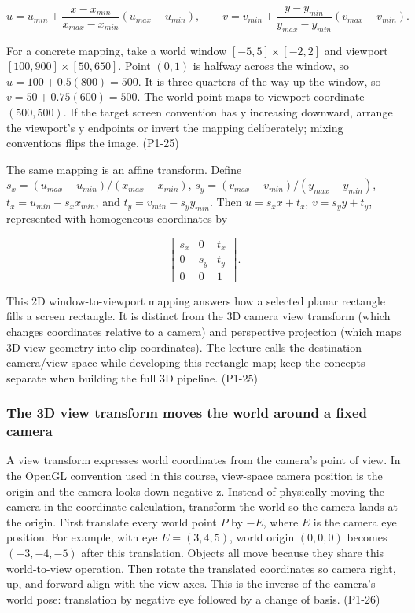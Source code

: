 \[
u=u_{min}+\frac{x-x_{min}}{x_{max}-x_{min}}(u_{max}-u_{min}),\qquad
v=v_{min}+\frac{y-y_{min}}{y_{max}-y_{min}}(v_{max}-v_{min}).
\]

For a concrete mapping, take a world window \([-5,5]\times[-2,2]\) and viewport \([100,900]\times[50,650]\). Point \((0,1)\) is halfway across the window, so \(u=100+0.5(800)=500\). It is three quarters of the way up the window, so \(v=50+0.75(600)=500\). The world point maps to viewport coordinate \((500,500)\). If the target screen convention has y increasing downward, arrange the viewport's y endpoints or invert the mapping deliberately; mixing conventions flips the image. (P1-25)

The same mapping is an affine transform. Define \(s_x=(u_{max}-u_{min})/(x_{max}-x_{min})\), \(s_y=(v_{max}-v_{min})/(y_{max}-y_{min})\), \(t_x=u_{min}-s_xx_{min}\), and \(t_y=v_{min}-s_yy_{min}\). Then \(u=s_xx+t_x\), \(v=s_yy+t_y\), represented with homogeneous coordinates by

\[
\begin{bmatrix}s_x&0&t_x\\0&s_y&t_y\\0&0&1\end{bmatrix}.
\]

This 2D window-to-viewport mapping answers how a selected planar rectangle fills a screen rectangle. It is distinct from the 3D camera view transform (which changes coordinates relative to a camera) and perspective projection (which maps 3D view geometry into clip coordinates). The lecture calls the destination camera/view space while developing this rectangle map; keep the concepts separate when building the full 3D pipeline. (P1-25)

\subsubsection{The 3D view transform moves the world around a fixed camera}\label{03-visual-computing-i-ch003-the-3d-view-transform-moves-the-world-around-a-fixed-camera}

\hypertarget{03-visual-computing-i-ch003-the-3d-view-transform-moves-the-world-around-a-fixed-camera}{}

A view transform expresses world coordinates from the camera's point of view. In the OpenGL convention used in this course, view-space camera position is the origin and the camera looks down negative z. Instead of physically moving the camera in the coordinate calculation, transform the world so the camera lands at the origin. First translate every world point \(P\) by \(-E\), where \(E\) is the camera eye position. For example, with eye \(E=(3,4,5)\), world origin \((0,0,0)\) becomes \((-3,-4,-5)\) after this translation. Objects all move because they share this world-to-view operation. Then rotate the translated coordinates so camera right, up, and forward align with the view axes. This is the inverse of the camera's world pose: translation by negative eye followed by a change of basis. (P1-26)

